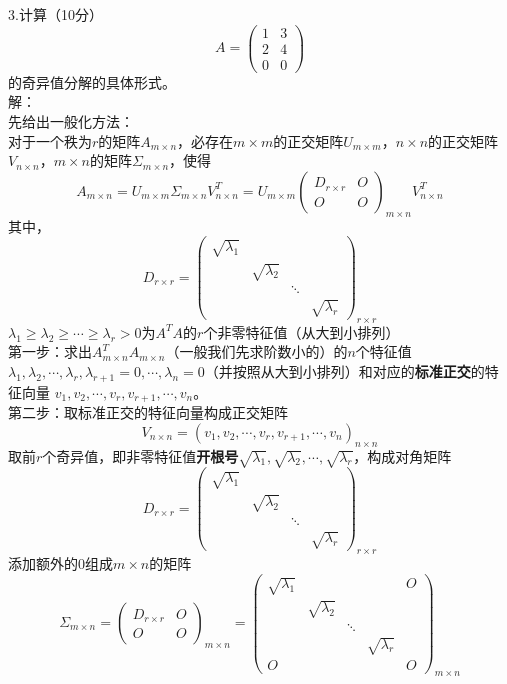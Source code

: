 \documentclass[UTF8]{ctexart}
\begin{document}
		
\noindent 3.计算（10分）
		\[
		A = \begin{pmatrix} 
			1 & 3 \\ 
			2 & 4 \\ 
			0 & 0 
		\end{pmatrix}
		\]
		的奇异值分解的具体形式。\\
解：\\
先给出一般化方法：\\
		对于一个秩为$r$的矩阵$A_{m \times n}$，必存在$m \times m$的正交矩阵$U_{m \times m}$，$n \times n$的正交矩阵$V_{n \times n}$，$m \times n$的矩阵$\Sigma_{m \times n}$，使得
		\[
		A_{m \times n} = U_{m \times m} \Sigma_{m \times n} V_{n \times n}^T = U_{m \times m} 
		\begin{pmatrix} 
			D_{r \times r} & O \\ 
			O & O 
		\end{pmatrix}_{m \times n} 
		V_{n \times n}^T
		\]
		其中，
		\[
		D_{r \times r} = \begin{pmatrix} 
			\sqrt{\lambda_1} & & \\ 
			& \sqrt{\lambda_2} & \\ 
			& & \ddots \\ 
			& & & \sqrt{\lambda_r} 
		\end{pmatrix}_{r \times r}
		\]
		$\lambda_1 \geq \lambda_2 \geq \cdots \geq \lambda_r > 0$为$A^T A$的$r$个非零特征值（从大到小排列）\\
		第一步：求出$A_{m \times n}^T A_{m \times n}$（一般我们先求阶数小的）的$n$个特征值
		$
		\lambda_1, \lambda_2, \cdots, \lambda_r, \lambda_{r+1} = 0, \cdots, \lambda_n = 0 $（并按照从大到小排列）和对应的\textbf{标准正交}的特征向量 $v_1, v_2, \cdots, v_r, v_{r+1}, \cdots, v_n。
		$\\
		第二步：取标准正交的特征向量构成正交矩阵
		\[
		V_{n \times n} = (v_1, v_2, \cdots, v_r, v_{r+1}, \cdots, v_n)_{n \times n}
		\]
		取前$r$个奇异值，即非零特征值\textbf{开根号}$\sqrt{\lambda_1}, \sqrt{\lambda_2}, \cdots, \sqrt{\lambda_r}$，构成对角矩阵
		\[
		D_{r \times r} = 
		\begin{pmatrix}
			\sqrt{\lambda_1} & & \\
			& \sqrt{\lambda_2} & \\
			& & \ddots \\
			& & & \sqrt{\lambda_r}
		\end{pmatrix}_{r \times r}
		\]
		添加额外的0组成$m \times n$的矩阵
		\[
		\Sigma_{m \times n} = 
		\begin{pmatrix}
			D_{r \times r} & O \\
			O & O
		\end{pmatrix}_{m \times n}
		=
		\begin{pmatrix}
			\sqrt{\lambda_1} & & & &O\\
			& \sqrt{\lambda_2} & & & \\
			& & \ddots & & \\
			& & & \sqrt{\lambda_r} & \\
			O& & & &O
		\end{pmatrix}_{m \times n}
		\]
\end{document}
